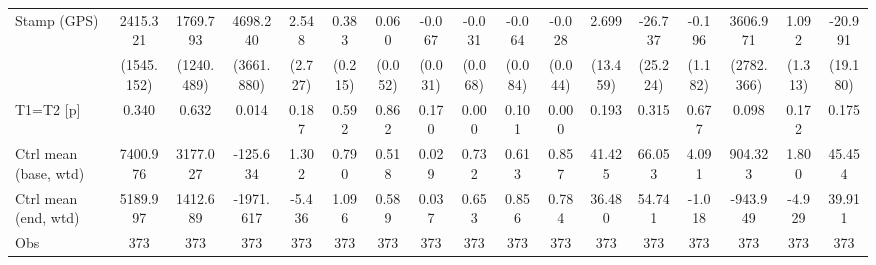 {\begin{tabular}{l*{16}{c}}
Stamp (GPS)         &    2415.321         &    1769.793         &    4698.240         &       2.548         &       0.383         &       0.060         &      -0.067\sym{*}  &      -0.031         &      -0.064         &      -0.028         &       2.699         &     -26.737         &      -0.196         &    3606.971         &       1.092         &     -20.991         \\
                    &  (1545.152)         &  (1240.489)         &  (3661.880)         &     (2.727)         &     (0.215)         &     (0.052)         &     (0.031)         &     (0.068)         &     (0.084)         &     (0.044)         &    (13.459)         &    (25.224)         &     (1.182)         &  (2782.366)         &     (1.313)         &    (19.180)         \\
\midrule
T1=T2 [p]           &       0.340         &       0.632         &       0.014         &       0.187         &       0.592         &       0.862         &       0.170         &       0.000         &       0.101         &       0.000         &       0.193         &       0.315         &       0.677         &       0.098         &       0.172         &       0.175         \\
Ctrl mean (base, wtd)&    7400.976         &    3177.027         &    -125.634         &       1.302         &       0.790         &       0.518         &       0.029         &       0.732         &       0.613         &       0.857         &      41.425         &      66.053         &       4.091         &     904.323         &       1.800         &      45.454         \\
Ctrl mean (end, wtd)&    5189.997         &    1412.689         &   -1971.617         &      -5.436         &       1.096         &       0.589         &       0.037         &       0.653         &       0.856         &       0.784         &      36.480         &      54.741         &      -1.018         &    -943.949         &      -4.929         &      39.911         \\
Obs                 &         373         &         373         &         373         &         373         &         373         &         373         &         373         &         373         &         373         &         373         &         373         &         373         &         373         &         373         &         373         &         373         \\
\bottomrule
\end{tabular}
}
